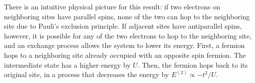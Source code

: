 There is an intuitive physical picture for this result: if two electrons on neighboring sites have parallel spins, none of the two can hop to the neighboring site due to Pauli's exclusion principle.
If adjacent sites have antiparallel spins, however, it is possible for any of the two electrons to hop to the neighboring site, and an exchange process allows the system to lower its energy.
First, a fermion hops to a neighboring site already occupied with an opposite spin fermion.
The intermediate state has a higher energy by $U$.
Then, the fermion hops back to its original site, in a process that decreases the energy by $E^{(2)} \propto - t^2 / U$.
